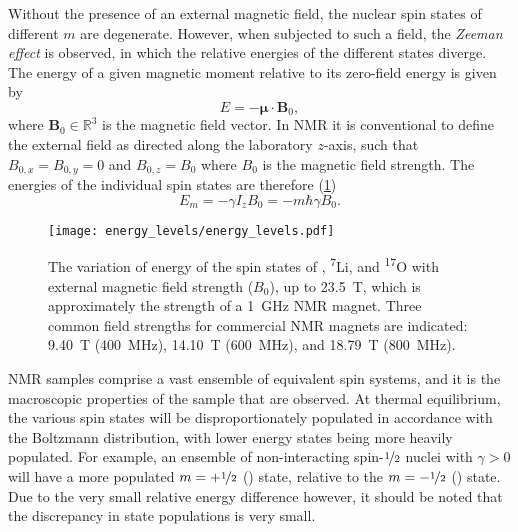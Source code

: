 Without the presence of an external magnetic field, the nuclear spin states of
different $m$ are degenerate. However, when subjected to such a field, the
\emph{Zeeman effect} is observed, in which the relative energies of the
different states diverge. The energy of a given magnetic moment relative to its
zero-field energy is given by
\begin{equation}
  E = - \symbf{\mu} \cdot \symbf{B}_0,
\end{equation}
where $\symbf{B}_0 \in \mathbb{R}^3$ is the magnetic field vector. In \ac{NMR}
it is conventional to define the external field as directed along the
laboratory $z$-axis, such that $B_{0,x} = B_{0,y} = 0$ and $B_{0,z} = B_0$
where $B_0$ is the magnetic field strength. The energies of the individual spin
states are therefore (\cref{fig:energy_levels})
\begin{equation}
  E_m = - \gamma I_z B_0 = -m \hbar \gamma B_0.
\end{equation}
\begin{figure}%
    \centering%
    \texttt{[image: energy\_levels/energy\_levels.pdf]}%
    \caption[%
        The variation of energy of the spin states of \proton,
        \textsuperscript{7}Li, and \textsuperscript{17}O with external magnetic
        field strength.
    ]{%
        The variation of energy of the spin states of \proton,
        \textsuperscript{7}Li, and \textsuperscript{17}O with external magnetic
        field strength ($B_0$), up to \qty{23.5}{\tesla}, which is
        approximately the strength of a \qty{1}{\giga \hertz} \ac{NMR} magnet.
        Three common field strengths for commercial NMR magnets are indicated:
        \qty{9.40}{\tesla} (\qty{400}{\mega\hertz}), \qty{14.10}{\tesla}
        (\qty{600}{\mega\hertz}), and \qty{18.79}{\tesla}
        (\qty{800}{\mega\hertz}).
    }%
    \label{fig:energy_levels}%
\end{figure}%
\ac{NMR} samples comprise a vast ensemble of equivalent spin systems, and it is
the macroscopic properties of the sample that are observed.
At thermal equilibrium, the various spin states will be disproportionately
populated in accordance with the Boltzmann distribution, with lower energy
states being more heavily populated. For example, an ensemble of
non-interacting spin-$\nicefrac{1}{2}$ nuclei with $\gamma > 0$ will have a
more populated $m = +\nicefrac{1}{2}$ (\textalpha) state, relative
to the $m = -\nicefrac{1}{2}$ (\textbeta) state. Due to the very small relative
energy difference however, it should be noted that the discrepancy in state
populations is very small.
